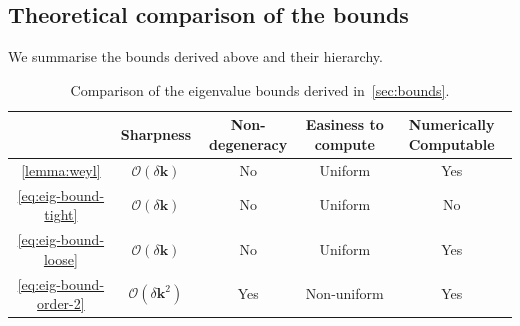 \documentclass[11pt]{article}
\numberwithin{equation}{section}
\begin{document}
\subsection{Theoretical comparison of the bounds}\label{sec:bounds-comparison}

We summarise the bounds derived above and their hierarchy.
\begin{table}[H]
    \centering
    \begin{tabular}{c|c|c|c|c}
                                     & Sharpness                            &
        Non-degeneracy               & Easiness to compute                  &
        Numerically Computable
        \\
        \hline
        \eqref{lemma:weyl}           & \(\mathcal{O}(\delta \mathbf{k})\)   & No  & Uniform     & Yes \\
        \eqref{eq:eig-bound-tight}   & \(\mathcal{O}(\delta \mathbf{k})\)   & No  & Uniform     & No  \\
        \eqref{eq:eig-bound-loose}   & \(\mathcal{O}(\delta \mathbf{k})\)   & No  & Uniform     & Yes \\
        \eqref{eq:eig-bound-order-2} & \(\mathcal{O}(\delta \mathbf{k}^2)\) & Yes & Non-uniform & Yes
    \end{tabular}
    \caption{Comparison of the eigenvalue bounds derived in~\autoref{sec:bounds}.}
    \label{tab:bounds-comparison}
\end{table}
\end{document}
